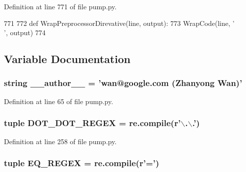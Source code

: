 \-Definition at line 771 of file pump.\-py.


\begin{DoxyCode}
771 
772 def WrapPreprocessorDirevative(line, output):
773   WrapCode(line, ' \\', output)
774 

\end{DoxyCode}


\subsection{\-Variable \-Documentation}
\hypertarget{namespacepump_a629d61dfe4da763164a4d1a2d85b0afd}{
\subsubsection[{\-\_\-\-\_\-author\-\_\-\-\_\-}]{\setlength{\rightskip}{0pt plus 5cm}string {\bf \-\_\-\-\_\-author\-\_\-\-\_\-} = 'wan@google.\-com (\-Zhanyong \-Wan)'}}\label{df/d92/namespacepump_a629d61dfe4da763164a4d1a2d85b0afd}


\-Definition at line 65 of file pump.\-py.

\hypertarget{namespacepump_a5267421d4c85117b52d918accf1b2cbe}{
\subsubsection[{\-D\-O\-T\-\_\-\-D\-O\-T\-\_\-\-R\-E\-G\-E\-X}]{\setlength{\rightskip}{0pt plus 5cm}tuple {\bf \-D\-O\-T\-\_\-\-D\-O\-T\-\_\-\-R\-E\-G\-E\-X} = re.\-compile(r'$\backslash$.$\backslash$.')}}\label{df/d92/namespacepump_a5267421d4c85117b52d918accf1b2cbe}


\-Definition at line 258 of file pump.\-py.

\hypertarget{namespacepump_a89c455f059588c995485f69128edcb04}{
\subsubsection[{\-E\-Q\-\_\-\-R\-E\-G\-E\-X}]{\setlength{\rightskip}{0pt plus 5cm}tuple {\bf \-E\-Q\-\_\-\-R\-E\-G\-E\-X} = re.\-compile(r'=')}}\label{df/d92/namespacepump_a89c455f059588c995485f69128edcb04}


